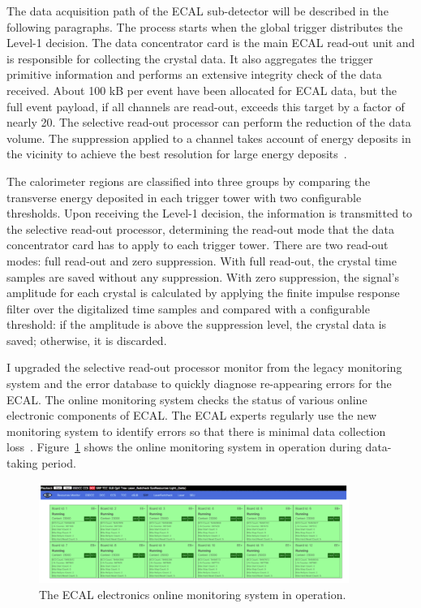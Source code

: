 The data acquisition path of the ECAL sub-detector will be described in the following paragraphs. The process starts when the global trigger distributes the Level-1 decision. The data concentrator card is the main ECAL read-out unit and is responsible for collecting the crystal data. It also aggregates the trigger primitive information and performs an extensive integrity check of the data received. About 100 kB per event have been allocated for ECAL data, but the full event payload, if all channels are read-out, exceeds this target by a factor of nearly 20. The selective read-out processor can perform the reduction of the data volume. The suppression applied to a channel takes account of energy deposits in the vicinity to achieve the best resolution for large energy deposits~\cite{Almeida:2008zz}.

The calorimeter regions are classified into three groups by comparing the transverse energy deposited in each trigger tower with two configurable thresholds. Upon receiving the Level-1 decision, the information is transmitted to the selective read-out processor, determining the read-out mode that the data concentrator card has to apply to each trigger tower. There are two read-out modes: full read-out and zero suppression. With full read-out, the crystal time samples are saved without any suppression. With zero suppression, the signal's amplitude for each crystal is calculated by applying the finite impulse response filter over the digitalized time samples and compared with a configurable threshold: if the amplitude is above the suppression level, the crystal data is saved; otherwise, it is discarded.

I upgraded the selective read-out processor monitor from the legacy monitoring system and the error database to quickly diagnose re-appearing errors for the ECAL. The online monitoring system checks the status of various online electronic components of ECAL. The ECAL experts regularly use the new monitoring system to identify errors so that there is minimal data collection loss~\cite{Siddireddy:2018gxt}. Figure~\ref{fig:SRP} shows the online monitoring system in operation during data-taking period.

\begin{figure}[htbp]
  \centering
  \includegraphics[width=0.9\textwidth]{plots/chapter3/SRP.png}
  \caption{The ECAL electronics online monitoring system in operation.}
  \label{fig:SRP}
\end{figure}

